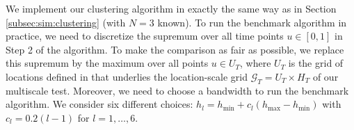 \documentclass[12pt]{article}
\makeatletter
\renewcommand{\eqref}[1]{\tagform@{\ref{#1}}}
\makeatother
\begin{document}
We implement our clustering algorithm in exactly the same way as in Section \ref{subsec:sim:clustering} (with $N=3$ known). To run the benchmark algorithm in practice, we need to discretize the supremum over all time points $u \in [0,1]$ in Step 2 of the algorithm. To make the comparison as fair as possible, we replace this supremum by the maximum over all points $u \in U_T$, where $U_T$ is the grid of locations defined in \eqref{eq:grid-loc} that underlies the location-scale grid $\mathcal{G}_T = U_T \times H_T$ of our multiscale test. Moreover, we need to choose a bandwidth to run the benchmark algorithm. We consider six different choices: $h_l = h_{\min} + c_l (h_{\max} - h_{\min})$ with $c_l = 0.2(l-1)$ for $l=1,\ldots,6$.



\begin{table}[t!]
\footnotesize{  
\begin{center}
\caption{Empirical probabilities that the estimated group structure is identical to the true group structure $\{ G_1,G_2,G_3\}$. $\mathcal{T}_{\text{MS}}$ denotes our multiscale method and $\mathcal{T}_{\text{bmk, }l}$ the benchmark procedure with bandwidth $h_l$ ($l=1,\ldots,6$). 
}\label{tab:clustering:comparison}
\renewcommand{\arraystretch}{1.2}  
{\color{red}}
\end{center}}
\end{table}
\end{document}
